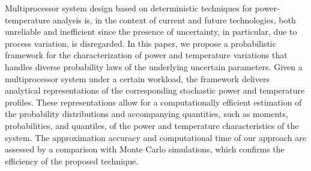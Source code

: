 Multiprocessor system design based on deterministic techniques for power-temperature analysis is, in the context of current and future technologies, both unreliable and inefficient since the presence of uncertainty, in particular, due to process variation, is disregarded.
In this paper, we propose a probabilistic framework for the characterization of power and temperature variations that handles diverse probability laws of the underlying uncertain parameters.
Given a multiprocessor system under a certain workload, the framework delivers analytical representations of the corresponding stochastic power and temperature profiles.
These representations allow for a computationally efficient estimation of the probability distributions and accompanying quantities, such as moments, probabilities, and quantiles, of the power and temperature characteristics of the system.
The approximation accuracy and computational time of our approach are assessed by a comparison with Monte Carlo simulations, which confirms the efficiency of the proposed technique.
